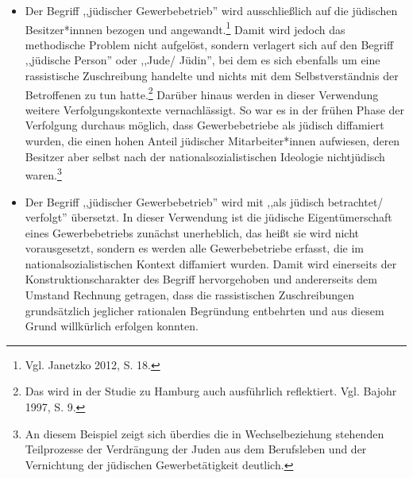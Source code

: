 \begin{itemize}
    \item Der Begriff ,,jüdischer Gewerbebetrieb'' wird ausschließlich auf die jüdischen Besitzer*innnen bezogen und angewandt.\footnote{Vgl. Janetzko 2012, S. 18.} Damit wird jedoch das methodische Problem nicht aufgelöst, sondern verlagert sich auf den Begriff ,,jüdische Person'' oder ,,Jude/ Jüdin'', bei dem es sich ebenfalls um eine rassistische Zuschreibung handelte und nichts mit dem Selbstverständnis der Betroffenen zu tun hatte.\footnote{Das wird in der Studie zu Hamburg auch ausführlich reflektiert. Vgl. Bajohr 1997, S. 9.} Darüber hinaus werden in dieser Verwendung weitere Verfolgungskontexte vernachlässigt. So war es in der frühen Phase der Verfolgung durchaus möglich, dass Gewerbebetriebe als jüdisch diffamiert wurden, die einen hohen Anteil jüdischer Mitarbeiter*innen aufwiesen, deren Besitzer aber selbst nach der nationalsozialistischen Ideologie nichtjüdisch waren.\footnote{An diesem Beispiel zeigt sich überdies die in Wechselbeziehung stehenden Teilprozesse der Verdrängung der Juden aus dem Berufsleben und der Vernichtung der jüdischen Gewerbetätigkeit deutlich.}
    \item Der Begriff ,,jüdischer Gewerbebetrieb'' wird mit ,,als jüdisch betrachtet/ verfolgt'' übersetzt. In dieser Verwendung ist die jüdische Eigentümerschaft eines Gewerbebetriebs zunächst unerheblich, das heißt sie wird nicht vorausgesetzt, sondern es werden alle Gewerbebetriebe erfasst, die im nationalsozialistischen Kontext diffamiert wurden. Damit wird einerseits der Konstruktionscharakter des Begriff hervorgehoben und andererseits dem Umstand Rechnung getragen, dass die rassistischen Zuschreibungen grundsätzlich jeglicher rationalen Begründung entbehrten und aus diesem Grund willkürlich erfolgen konnten.
\end{itemize}


